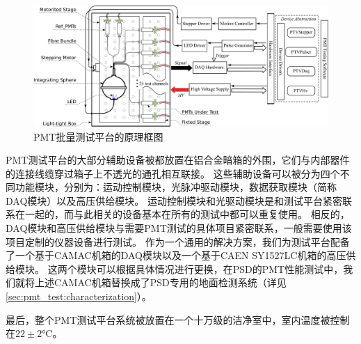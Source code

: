 \begin{figure}[htb]
	\centering
	\includegraphics[width=\textwidth]{chap/pmt_test/fig/testbench_schematic.eps}
	\caption{PMT批量测试平台的原理框图}
	\label{fig:pmt_test:testbench_schematic}
\end{figure}

PMT测试平台的大部分辅助设备被都放置在铝合金暗箱的外围，它们与内部器件的连接线缆穿过箱子上不透光的通孔相互联接。
这些辅助设备可以被分为四个不同功能模块，分别为：运动控制模块，光脉冲驱动模块，数据获取模块（简称DAQ模块）以及高压供给模块。
运动控制模块和光驱动模块是和测试平台紧密联系在一起的，而与此相关的设备基本在所有的测试中都可以重复使用。
相反的，DAQ模块和高压供给模块与需要PMT测试的具体项目紧密联系，一般需要使用该项目定制的仪器设备进行测试。
作为一个通用的解决方案，我们为测试平台配备了一个基于CAMAC机箱的DAQ模块以及一个基于CAEN SY1527LC机箱\cite{sy1527lc}的高压供给模块。
这两个模块可以根据具体情况进行更换，在PSD的PMT性能测试中，我们就将上述CAMAC机箱替换成了PSD专用的地面检测系统（详见\ref{sec:pmt_test:characterization}）。

最后，整个PMT测试平台系统被放置在一个十万级的洁净室中，室内温度被控制在$22\pm2$\si{\celsius}。

